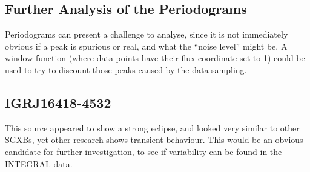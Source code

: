 \subsection{Further Analysis of the Periodograms}
Periodograms can present a challenge to analyse, since it is not immediately obvious if a peak is spurious or real, and what the \textquotedblleft{}noise level\textquotedblright{} might be. A window function (where data points have their flux coordinate set to 1) could be used to try to discount those peaks caused by the data sampling.

\subsection{IGRJ16418-4532}
This source appeared to show a strong eclipse, and looked very similar to other SGXBs, yet other research shows transient behaviour. This would be an obvious candidate for further investigation, to see if variability can be found in the INTEGRAL data. 
